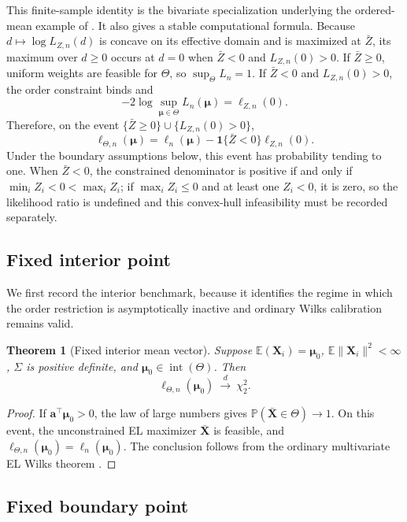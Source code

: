 \documentclass[11pt]{article}
\newtheorem{theorem}{Theorem}[section]
\theoremstyle{remark}
\newcommand{\E}{\mathbb{E}}
\newcommand{\Pp}{\mathbb{P}}
\newcommand{\interior}{\operatorname{int}}
\begin{document}
This finite-sample identity is the bivariate specialization underlying the ordered-mean example of \citet{el1996empirical}. It also gives a stable computational formula. Because $d\mapsto\log L_{Z,n}(d)$ is concave on its effective domain and is maximized at $\bar Z$, its maximum over $d\geq0$ occurs at $d=0$ when $\bar Z<0$ and $L_{Z,n}(0)>0$. If $\bar Z\geq0$, uniform weights are feasible for $\Theta$, so $\sup_{\Theta}L_n=1$. If $\bar Z<0$ and $L_{Z,n}(0)>0$, the order constraint binds and
$$
  -2\log\sup_{\boldsymbol{\mu}\in\Theta}L_n(\boldsymbol{\mu})=\ell_{Z,n}(0).
$$
Therefore, on the event $\{\bar Z\geq0\}\cup\{L_{Z,n}(0)>0\}$,
$$
  \ell_{\Theta,n}(\boldsymbol{\mu})
  =
  \ell_n(\boldsymbol{\mu})
  -
  \mathbf 1\{\bar Z<0\}\ell_{Z,n}(0).
$$
Under the boundary assumptions below, this event has probability tending to one. When $\bar Z<0$, the constrained denominator is positive if and only if $\min_i Z_i<0<\max_i Z_i$; if $\max_i Z_i\leq0$ and at least one $Z_i<0$, it is zero, so the likelihood ratio is undefined and this convex-hull infeasibility must be recorded separately.

\subsection{Fixed interior point}

We first record the interior benchmark, because it identifies the regime in which the order restriction is asymptotically inactive and ordinary Wilks calibration remains valid.

\begin{theorem}[Fixed interior mean vector]\label{thm:interior}
Suppose $\E(\boldsymbol{X}_i)=\boldsymbol{\mu}_0$, $\E\|\boldsymbol{X}_i\|^2<\infty$, $\Sigma$ is positive definite, and $\boldsymbol{\mu}_0\in\interior(\Theta)$.  Then
$$
  \ell_{\Theta,n}(\boldsymbol{\mu}_0)\ \xrightarrow{d}\ \chi^2_2.
$$
\end{theorem}

\begin{proof}
If $\boldsymbol{a}^\top\boldsymbol{\mu}_0>0$, the law of large numbers gives $\Pp(\bar{\boldsymbol{X}}\in\Theta)\to1$.  On this event, the unconstrained EL maximizer $\bar{\boldsymbol{X}}$ is feasible, and $\ell_{\Theta,n}(\boldsymbol{\mu}_0)=\ell_n(\boldsymbol{\mu}_0)$.  The conclusion follows from the ordinary multivariate EL Wilks theorem \citet{owen1990,owen2001}.
\end{proof}

\subsection{Fixed boundary point}\label{sec:boundary}
\end{document}
